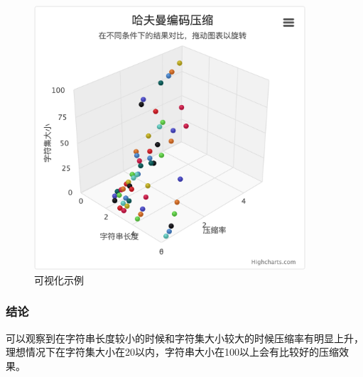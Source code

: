 \documentclass{article}
\begin{document}
\begin{figure}[htbp]
    
    \centering\includegraphics[width=0.9\textwidth]{./Images/pic4_2_3.png}
    
    \caption{可视化示例}
    
\end{figure}

\subsubsection{结论}

可以观察到在字符串长度较小的时候和字符集大小较大的时候压缩率有明显上升，理想情况下在字符集大小在20以内，字符串大小在100以上会有比较好的压缩效果。
\end{document}
